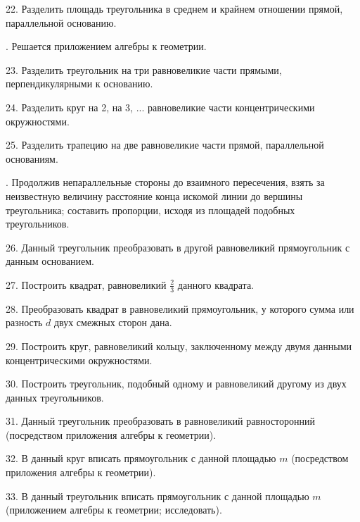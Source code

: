 \documentclass[oneside]{book}
\begin{document}
22.
Разделить площадь треугольника в среднем и крайнем отношении прямой, параллельной основанию.

.
Решается приложением алгебры к геометрии.

23.
Разделить треугольник на три равновеликие части прямыми, перпендикулярными к основанию.

24.
Разделить круг на 2, на 3, ...
равновеликие части концентрическими окружностями.

25.
Разделить трапецию на две равновеликие части прямой, параллельной основаниям.

.
Продолжив непараллельные стороны до взаимного пересечения, взять за неизвестную величину расстояние конца искомой линии до вершины треугольника;
составить пропорции, исходя из площадей подобных треугольников.

26.
Данный треугольник преобразовать в другой равновеликий прямоугольник с данным основанием.

27.
Построить квадрат, равновеликий $\tfrac23$ данного квадрата.

28.
Преобразовать квадрат в равновеликий прямоугольник, у которого сумма или разность $d$ двух смежных сторон дана.

29.
Построить круг, равновеликий кольцу, заключенному между двумя данными концентрическими окружностями.

30.
Построить треугольник, подобный одному и равновеликий другому из двух данных треугольников.

31.
Данный треугольник преобразовать в равновеликий равносторонний (посредством приложения алгебры к геометрии).

32.
В данный круг вписать прямоугольник с данной площадью $m$ (посредством приложения алгебры к геометрии).

33.
В данный треугольник вписать прямоугольник с данной площадью $m$ (приложением алгебры к геометрии; исследовать).
\end{document}
